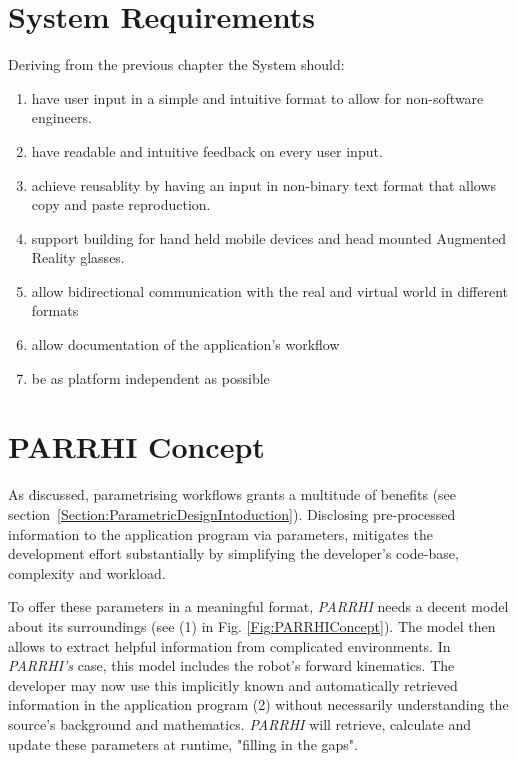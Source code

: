 \section{System Requirements}\label{Section:SystemRequirements}
Deriving from the previous chapter the System should:
\begin{enumerate}
	\setlength\itemsep{-1em}
	\item have user input in a simple and intuitive format to allow for non-software engineers.
	\item have readable and intuitive feedback on every user input.
	\item achieve reusablity by having an input in non-binary text format that allows copy and paste reproduction.
	\item support building for hand held mobile devices and head mounted Augmented Reality glasses.
	\item allow bidirectional communication with the real and virtual world in different formats
	\item allow documentation of the application's workflow
	\item be as platform independent as possible
\end{enumerate}

\clearpage
\section{PARRHI Concept}
As discussed, parametrising workflows grants a multitude of benefits (see section~\ref{Section:ParametricDesignIntoduction}). Disclosing pre-processed information to the application program via parameters, mitigates the development effort substantially by simplifying the developer's code-base, complexity and workload.  

To offer these parameters in a meaningful format, \textit{PARRHI} needs a decent model about its surroundings (see (1) in Fig. \ref{Fig:PARRHIConcept}). The model then allows to extract helpful information from complicated environments. In \textit{PARRHI's} case, this model includes the robot's forward kinematics. The developer may now use this implicitly known and automatically retrieved information in the application program (2) without necessarily understanding the source's background and mathematics. \textit{PARRHI} will retrieve, calculate and update these parameters at runtime, "filling in the gaps".

